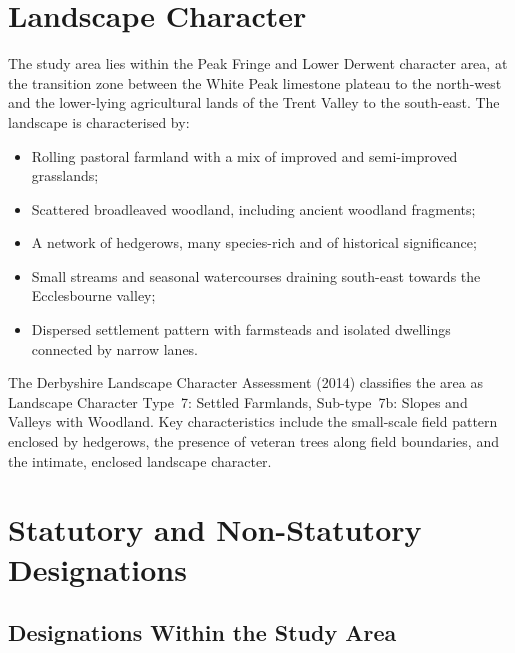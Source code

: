 \section{Landscape Character}

The study area lies within the Peak Fringe and Lower Derwent character area, at the transition zone between the White Peak limestone plateau to the north-west and the lower-lying agricultural lands of the Trent Valley to the south-east. The landscape is characterised by:

\begin{itemize}[nosep]
  \item Rolling pastoral farmland with a mix of improved and semi-improved grasslands;
  \item Scattered broadleaved woodland, including ancient woodland fragments;
  \item A network of hedgerows, many species-rich and of historical significance;
  \item Small streams and seasonal watercourses draining south-east towards the Ecclesbourne valley;
  \item Dispersed settlement pattern with farmsteads and isolated dwellings connected by narrow lanes.
\end{itemize}

The Derbyshire Landscape Character Assessment (2014) classifies the area as Landscape Character Type~7: Settled Farmlands, Sub-type~7b: Slopes and Valleys with Woodland. Key characteristics include the small-scale field pattern enclosed by hedgerows, the presence of veteran trees along field boundaries, and the intimate, enclosed landscape character.


\section{Statutory and Non-Statutory Designations}

\subsection{Designations Within the Study Area}

